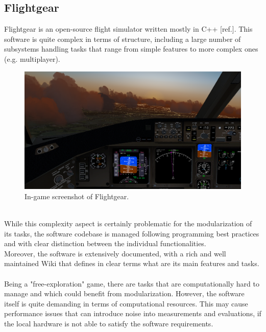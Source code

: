 \subsection{Flightgear}
Flightgear is an open-source flight simulator written mostly in C++ [ref.]. This software is quite complex in terms of structure, including a large number of subsystems handling tasks that range from simple features to more complex ones (e.g. multiplayer).
\begin{figure}[h!]
	\centering
	\includegraphics[width=0.8\linewidth]{"immagini/Feasibility study/Flightgear"}
	\caption[In-game screenshot of Flightgear.]{In-game screenshot of Flightgear.}
	\label{fig:flightgear}
\end{figure}
\\ While this complexity aspect is certainly problematic for the modularization of its tasks, the software codebase is managed following programming best practices and with clear distinction between the individual functionalities. \\
Moreover, the software is extensively documented, with a rich and well maintained Wiki that defines in clear terms what are its main features and tasks. \\ \\
Being a "free-exploration" game, there are tasks that are computationally hard to manage and which could benefit from modularization. However, the software itself is quite demanding in terms of computational resources. This may cause performance issues that can introduce noise into measurements and evaluations, if the local hardware is not able to satisfy the software requirements.

